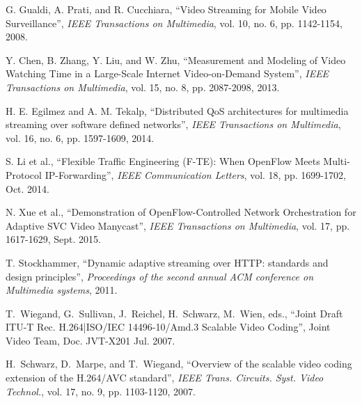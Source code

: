 \documentclass[journal,draftclsnofoot,onecolumn]{IEEEtran}
\begin{document}

%
%
%
\begin{thebibliography}{1}

G. Gualdi, A. Prati, and R. Cucchiara, ``Video Streaming for Mobile Video Surveillance'', {\em IEEE Transactions on Multimedia}, vol. 10, no. 6, pp. 1142-1154, 2008.

Y. Chen, B. Zhang, Y. Liu, and W. Zhu, ``Measurement and Modeling of Video Watching Time in a Large-Scale Internet Video-on-Demand System'', {\em IEEE Transactions on Multimedia}, vol. 15, no. 8, pp. 2087-2098, 2013.

H. E. Egilmez and A. M. Tekalp, ``Distributed QoS architectures for multimedia streaming over software defined networks'', {\em IEEE Transactions on Multimedia}, vol. 16, no. 6, pp. 1597-1609, 2014.

S. Li et al., ``Flexible Traffic Engineering (F-TE): When OpenFlow Meets Multi-Protocol IP-Forwarding'', {\em IEEE Communication Letters}, vol. 18, pp. 1699-1702, Oct. 2014.

N. Xue et al., ``Demonstration of OpenFlow-Controlled Network Orchestration for Adaptive SVC Video Manycast'', {\em IEEE Transactions on Multimedia}, vol. 17, pp. 1617-1629, Sept. 2015.

T. Stockhammer, ``Dynamic adaptive streaming over HTTP: standards and design principles'', {\em Proceedings of the second annual ACM conference on Multimedia systems}, 2011.

T.~Wiegand, G.~Sullivan, J.~Reichel, H.~Schwarz, M.~Wien, eds., ``Joint Draft ITU-T Rec. H.264|ISO/IEC 14496-10/Amd.3 Scalable Video Coding'', Joint Video Team, Doc. JVT-X201 Jul. 2007.

H.~Schwarz, D.~Marpe, and T.~Wiegand, ``Overview of the scalable video coding extension of the H.264/AVC standard'', {\em IEEE Trans. Circuits. Syst. Video Technol.}, vol. 17, no. 9, pp. 1103-1120, 2007.


\end{thebibliography}
\end{document}
